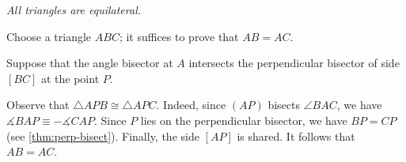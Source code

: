  \textit{All triangles are equilateral.}

Choose a triangle $ABC$; it suffices to prove that $AB = AC$.

Suppose that the angle bisector at $A$ intersects the perpendicular bisector of side $[BC]$ at the point $P$.

Observe that $\triangle APB\cong \triangle APC$.
Indeed, since $(AP)$ bisects $\angle BAC$, we have $\measuredangle BAP\equiv -\measuredangle CAP$.
Since $P$ lies on the perpendicular bisector, we have $BP=CP$ (see \ref{thm:perp-bisect}).
Finally, the side $[AP]$ is shared.
It follows that $AB = AC$.
\qeds

